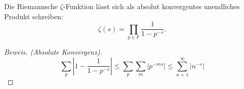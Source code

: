 \begin{frame}
    \begin{lemma}[Eulerprodukt]
        Die Riemannsche $\zeta$-Funktion lässt sich als absolut konvergentes unendliches Produkt schreiben:
    \[
        \zeta(s) = \prod_{p\in \mathbb{P}}\frac{1}{1-p^{-s}}.
    \]
    \end{lemma}
    \begin{proof}[Beweis. (Absolute Konvergenz)]
        \[
        \sum_p \left|1 - \frac{1}{1-p^{-s}}\right| \leq \sum_p\sum_m \left|p^{-ms}\right| \leq \sum_{n=1}^\infty \left|n^{-s}\right|
        \]
    \end{proof}
\end{frame}